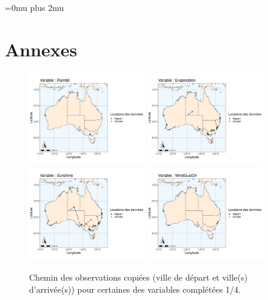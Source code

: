 \documentclass{article}
\begin{document}
\newpage
\Urlmuskip=0mu plus 2mu
\printbibliography

\newpage
\section{Annexes}

\begin{figure}[htp]
    \centering
    \includegraphics[width=0.45\textwidth]{Images/Australia_map_segments_complete/Australia_map_segments_complete-01.png}
    \includegraphics[width=0.45\textwidth]{Images/Australia_map_segments_complete/Australia_map_segments_complete-02.png}
    \includegraphics[width=0.45\textwidth]{Images/Australia_map_segments_complete/Australia_map_segments_complete-03.png}
    \includegraphics[width=0.45\textwidth]{Images/Australia_map_segments_complete/Australia_map_segments_complete-04.png}
    \caption{Chemin des observations copiées (ville de départ et ville(s) d'arrivée(s)) pour certaines des variables complétées 1/4.}
    \label{fig:path_data1}
\end{figure}
\end{document}
